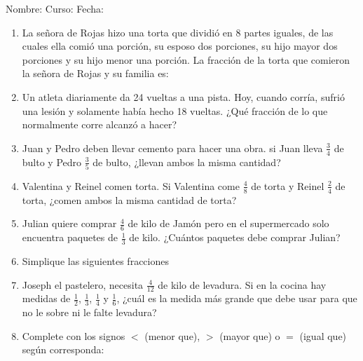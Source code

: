 \documentclass[letterpaper,fleqn]{article}
\newcommand{\LineaNombre}{%
\par
\vspace{\baselineskip}
Nombre:\hrulefill \; Curso: \underline{\hspace*{48pt}} \; Fecha: \underline{\hspace*{2.5cm}} \relax
\par}
\begin{document}
\LineaNombre
\begin{enumerate}
 \item La señora de Rojas hizo una torta que dividió en 8 partes iguales, de las cuales ella comió una porción, su esposo dos porciones, su hijo mayor dos porciones y su hijo menor una porción. La fracción de la torta que comieron la señora de Rojas y su familia es: \noanswer
 \item Un atleta diariamente da 24 vueltas a una pista. Hoy, cuando corría, sufrió una lesión y solamente había hecho 18 vueltas. ¿Qué  fracción de lo que normalmente corre alcanzó a hacer? \noanswer
\item Juan y Pedro deben llevar cemento para hacer una obra. si Juan lleva $\frac{3}{4}$ de bulto y Pedro $\frac{3}{5}$ de bulto, ¿llevan ambos la misma cantidad?\noanswer
\newpage
\item Valentina y Reinel comen torta. Si Valentina come $\frac{4}{8}$ de torta y Reinel $\frac{2}{4}$ de torta, ¿comen ambos la misma cantidad de torta?\noanswer
\item Julian quiere comprar $\frac{4}{6}$ de kilo de Jamón pero en el supermercado solo encuentra  paquetes de $\frac{1}{3}$ de kilo. ¿Cuántos paquetes debe comprar Julian?\noanswer
\item Simplique las siguientes fracciones
\begin{enumerate}
\end{enumerate}
\item Joseph el pastelero, necesita $\frac{4}{12}$ de kilo de levadura. Si en la cocina hay medidas de $\frac{1}{2}$, $\frac{1}{3}$, $\frac{1}{4}$ y $\frac{1}{6}$, ¿cu\'{a}l es la medida m\'{a}s grande que debe usar para que no le sobre ni le falte levadura?\noanswer
\item Complete con los signos $<$ (menor que), $>$ (mayor que) o $=$ (igual que) según corresponda:
\begin{enumerate}
\end{enumerate}
\end{enumerate}
\end{document}
